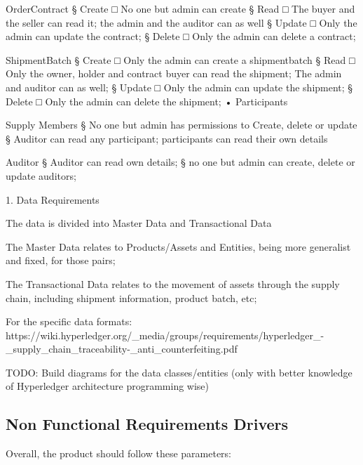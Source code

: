 {		\par OrderContract
			§ Create
				□ No one but admin can create
			§ Read
				□ The buyer and the seller can read it; the admin and the auditor can as well
			§ Update
				□ Only the admin can update the contract;
			§ Delete
				□ Only the admin can delete a contract;
		\par ShipmentBatch
			§ Create
				□ Only the admin can create a shipmentbatch
			§ Read
				□ Only the owner, holder and contract buyer can read the shipment; The admin and auditor can as well;
			§ Update
				□ Only the admin can update the shipment;
			§ Delete
				□ Only the admin can delete the shipment;
	• Participants
		\par Supply Members
			§ No one but admin has permissions to Create, delete or update
			§ Auditor can read any participant; participants can read their own details
		\par Auditor
			§ Auditor can read own details; 
			§ no one but admin can create, delete or update auditors;
		

	1. Data Requirements
		\par The data is divided into Master Data and Transactional Data
		\par The Master Data relates to Products/Assets and Entities, being more generalist and fixed, for those pairs;
		\par The Transactional Data relates to the movement of assets through the supply chain, including shipment information, product batch, etc;
		\par For the specific data formats: https://wiki.hyperledger.org/\_media/groups/requirements/hyperledger\_-\_supply\_chain\_traceability-\_anti\_counterfeiting.pdf
		\par TODO: Build diagrams for the data classes/entities (only with better knowledge of Hyperledger architecture programming wise)
		
		

\subsection{Non Functional Requirements Drivers}

Overall, the product should follow these parameters:

}
